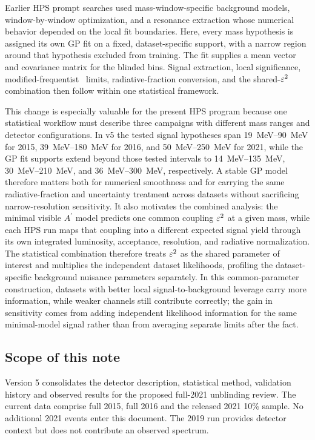 Earlier HPS prompt searches used mass-window-specific background models,
window-by-window optimization, and a resonance extraction whose numerical behavior
depended on the local fit boundaries. Here, every mass hypothesis is assigned its own
GP fit on a fixed, dataset-specific support, with a narrow region around that hypothesis
excluded from training. The fit supplies a mean vector and covariance matrix for the
blinded bins. Signal extraction, local significance, modified-frequentist \CLs\ limits,
radiative-fraction conversion, and the shared-$\varepsilon^2$ combination then follow within
one statistical framework.

This change is especially valuable for the present HPS program because one statistical
workflow must describe three campaigns with different mass ranges and detector
configurations. In v5 the tested signal hypotheses span \SIrange{19}{90}{MeV} for
2015, \SIrange{39}{180}{MeV} for 2016, and \SIrange{50}{250}{MeV} for 2021, while
the GP fit supports extend beyond those tested intervals to
\SIrange{14}{135}{MeV}, \SIrange{30}{210}{MeV}, and
\SIrange{36}{300}{MeV}, respectively. A stable GP model therefore matters both for
numerical smoothness and for carrying the same radiative-fraction and uncertainty
treatment across datasets without sacrificing narrow-resolution sensitivity. It also
motivates the combined analysis:
the minimal visible $A^\prime$ model predicts one common coupling $\varepsilon^2$ at a given
mass, while each HPS run maps that coupling into a different expected signal yield
through its own integrated luminosity, acceptance, resolution, and radiative
normalization. The
statistical combination therefore treats $\varepsilon^2$ as the shared parameter of interest
and multiplies the independent dataset likelihoods, profiling the dataset-specific
background nuisance parameters separately. In this common-parameter construction,
datasets with better local signal-to-background leverage carry more information, while
weaker channels still contribute correctly; the gain in sensitivity comes from adding
independent likelihood information for the same minimal-model signal rather than from
averaging separate limits after the fact.

\subsection{Scope of this note}

Version 5 consolidates the detector description, statistical method, validation
history and observed results for the proposed full-2021 unblinding review. The
current data comprise full 2015, full 2016 and the released 2021 10\% sample.
No additional 2021 events enter this document. The 2019 run provides detector
context but does not contribute an observed spectrum.

